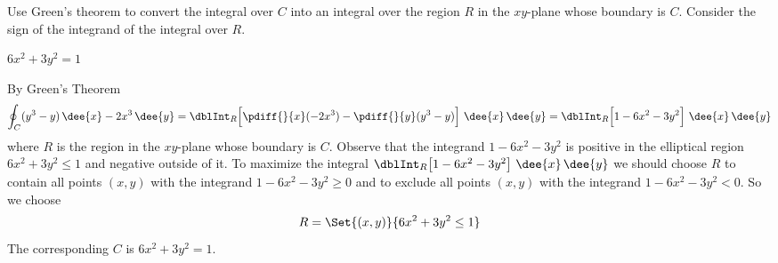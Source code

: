 \begin{hint}
Use Green's theorem to convert the integral over $C$ into an integral
over the region $R$ in the $xy$-plane whose boundary is $C$. Consider
the sign of the integrand of the integral over $R$.
\end{hint}

\begin{answer}
$6x^2+3y^2= 1$
\end{answer}

\begin{solution}
By Green's Theorem
\begin{equation*}
\oint_C(y^3-y)\,\dee{x}-2x^3\,\dee{y}
=\dblInt_R\Big[\pdiff{}{x}(-2x^3)
-\pdiff{}{y}(y^3-y)\Big]\ \dee{x}\,\dee{y}
=\dblInt_R\Big[1-6x^2-3y^2\Big]\ \dee{x}\,\dee{y}
\end{equation*}
where $R$ is the region in the $xy$-plane whose boundary is $C$. Observe
that the integrand $1-6x^2-3y^2$ is positive in the elliptical region
 $6x^2+3y^2\le 1$ and negative outside of it. To maximize the integral
$\dblInt_R\big[1-6x^2-3y^2\big]\ \dee{x}\,\dee{y}$ we should choose $R$ to contain
all points $(x,y)$ with the integrand $1-6x^2-3y^2\ge 0$ and to exclude
all points $(x,y)$ with the integrand $1-6x^2-3y^2< 0$. So we
choose
\begin{equation*}
R=\Set{(x,y)}{6x^2+3y^2\le 1}
\end{equation*}
The corresponding $C$ is $6x^2+3y^2= 1$.



\end{solution}
